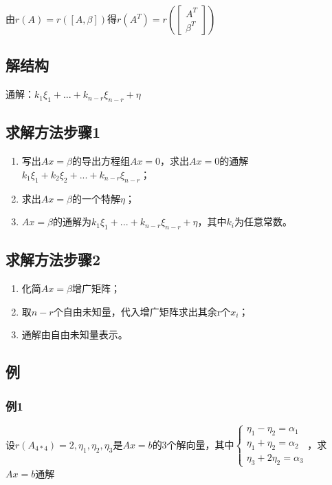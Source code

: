 由\(r(A) = r([A, \beta])\)得\(r(A^T) = r(\begin{bmatrix}
A^T \\ 
\beta^T
\end{bmatrix})\)

\subsection{解结构}
通解：\(k_1\xi_1 + ... + k_{n - r}\xi_{n - r} + \eta\)


\subsection{求解方法步骤1}
\begin{enumerate}
    \item 写出\(Ax = \beta\)的导出方程组\(Ax = 0\)，求出\(Ax = 0\)的通解\(k_1\xi_1 + k_2\xi_2 + ... + k_{n - r}\xi_{n - r}\)；
    \item 求出\(Ax = \beta\)的一个特解\(\eta\)；
    \item \(Ax = \beta\)的通解为\(k_1\xi_1 + ... + k_{n - r}\xi_{n - r} + \eta\)，其中\(k_i\)为任意常数。
\end{enumerate}


\subsection{求解方法步骤2}
\begin{enumerate}
    \item 化简\(Ax = \beta\)增广矩阵；
    \item 取\(n - r\)个自由未知量，代入增广矩阵求出其余r个\(x_i\)；
    \item 通解由自由未知量表示。
\end{enumerate}


\subsection{例}

\subsubsection{例1}
设\(r(A_{4 * 4}) = 2, \eta_1, \eta_2, \eta_3\)是\(Ax = b\)的3个解向量，其中\(\begin{cases}
\eta_1 - \eta_2 = \alpha_1 \\ 
\eta_1 + \eta_2 = \alpha_2 \\ 
\eta_3 + 2\eta_2 = \alpha_3
\end{cases}\)，求\(Ax = b\)通解

